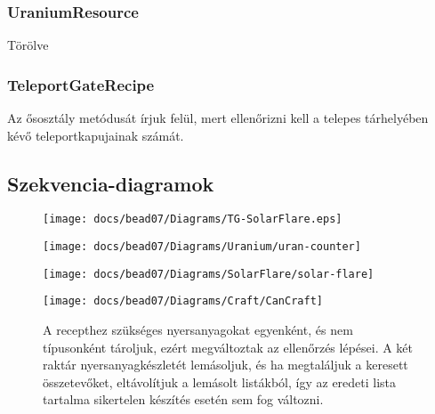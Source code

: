 \documentclass[../../projlab]{subfiles}
\begin{document}
\subsubsection{UraniumResource}
\begin{class-template-responsibility}
    Törölve
\end{class-template-responsibility}

\subsubsection{TeleportGateRecipe}
\begin{class-template-attribute}
\end{class-template-attribute}
\begin{class-template-method}
                {Az ősosztály metódusát írjuk felül, mert ellenőrizni kell a telepes tárhelyében kévő teleportkapujainak számát.}
\end{class-template-method}

\subsection{Szekvencia-diagramok}


\begin{figure}[H] 
    \centering 
    \texttt{[image: docs/bead07/Diagrams/TG-SolarFlare.eps]} 
    \caption{} 
\end{figure}

\begin{figure}[H] 
    \centering 
    \texttt{[image: docs/bead07/Diagrams/Uranium/uran-counter]} 
    \caption{} 
\end{figure}

\begin{figure}[H] 
    \centering 
    \texttt{[image: docs/bead07/Diagrams/SolarFlare/solar-flare]} 
    \caption{} 
\end{figure}

\begin{figure}[H] 
    \centering 
    \texttt{[image: docs/bead07/Diagrams/Craft/CanCraft]} 
    \caption{A recepthez szükséges nyersanyagokat egyenként, és nem típusonként tároljuk, ezért megváltoztak az ellenőrzés lépései. A két raktár nyersanyagkészletét lemásoljuk, és ha megtaláljuk a keresett összetevőket, eltávolítjuk a lemásolt listákból, így az eredeti lista tartalma sikertelen készítés esetén sem fog változni. } 
\end{figure} 
\end{document}
